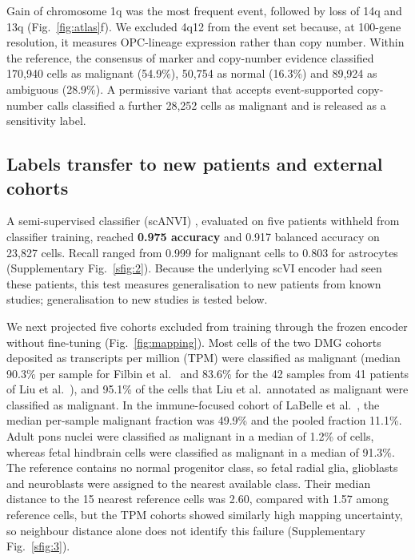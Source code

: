 \documentclass[11pt,a4paper]{article}
\begin{document}
Gain of chromosome 1q was the most frequent event, followed by loss of 14q and 13q (Fig.~\ref{fig:atlas}f). We excluded
4q12 from the event set because, at 100-gene resolution, it measures OPC-lineage expression rather than copy number.
Within the reference, the consensus of marker and copy-number evidence classified 170,940 cells as malignant (54.9\%),
50,754 as normal (16.3\%) and 89,924 as ambiguous (28.9\%). A permissive variant that accepts event-supported
copy-number calls classified a further 28,252 cells as malignant and is released as a sensitivity label.



\subsection{Labels transfer to new patients and external cohorts}

A semi-supervised classifier (scANVI) \citep{xu2021probabilistic}, evaluated on five patients withheld from classifier
training, reached \textbf{0.975 accuracy} and 0.917 balanced accuracy on 23,827 cells. Recall ranged from 0.999 for
malignant cells to 0.803 for astrocytes (Supplementary Fig.~\ref{sfig:2}). Because the underlying scVI encoder had seen
these patients, this test measures generalisation to new patients from known studies; generalisation to new studies is
tested below.

We next projected five cohorts excluded from training through the frozen encoder without fine-tuning
(Fig.~\ref{fig:mapping}). Most cells of the two DMG cohorts deposited as transcripts per million (TPM) were classified as
malignant (median 90.3\% per sample for Filbin et al.\ \citep{filbin2018developmental} and 83.6\% for the 42 samples from 41
patients of Liu et al.\ \citep{liu2022landscape}), and 95.1\% of the cells that Liu et al.\ annotated as malignant were
classified as malignant. In the immune-focused cohort of LaBelle et al.\ \citep{labelle2025dissecting}, the median per-sample malignant fraction
was 49.9\% and the pooled fraction 11.1\%. Adult pons nuclei \citep{siletti2023transcriptomic} were classified as
malignant in a median of 1.2\% of cells, whereas fetal hindbrain cells \citep{braun2023comprehensive} were classified as
malignant in a median of 91.3\%. The reference contains no normal progenitor class, so fetal radial glia, glioblasts and
neuroblasts were assigned to the nearest available class. Their median distance to the 15 nearest reference cells was 2.60,
compared with 1.57 among reference cells, but the TPM cohorts showed similarly high mapping uncertainty, so neighbour distance alone
does not identify this failure (Supplementary Fig.~\ref{sfig:3}).
\end{document}
